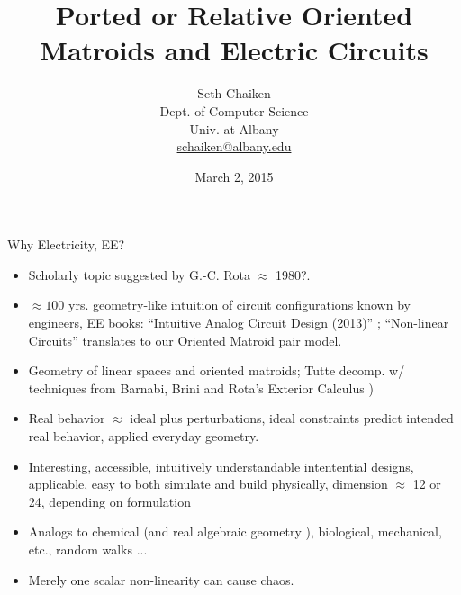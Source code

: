 \documentclass{beamer}
\title{Ported or Relative Oriented Matroids and Electric Circuits}
\author{Seth Chaiken\\
Dept. of Computer Science\\
Univ. at Albany\\
\url{schaiken@albany.edu}
}
\date{March 2, 2015}
\begin{document}
\begin{frame}
 \titlepage
\end{frame}


\begin{frame}{Why Electricity, EE?}
\begin{itemize}
\item Scholarly topic suggested by G.-C. Rota $\approx$ 1980?.
\item $\approx 100$ yrs. geometry-like intuition of
circuit configurations known by engineers, EE books:
``Intuitive Analog Circuit Design (2013)''
\cite{intuitAna}; ``Non-linear Circuits'' \cite{HaslerNeirynck}
translates to our Oriented Matroid pair model.

\item Geometry of linear spaces and oriented matroids;
Tutte decomp. w/
techniques from Barnabi, Brini and Rota's Exterior Calculus 
\cite{exteriorCalc})

\item
Real behavior $\approx$ ideal plus perturbations,
ideal constraints predict intended real behavior,
applied everyday geometry.

\item 
Interesting, accessible, intuitively understandable
intentential designs, applicable,
easy to both simulate and build physically, dimension
$\approx$
12 or 24, depending on formulation
\item
Analogs to chemical (and real algebraic geometry 
\cite{signsInChemRAG}), biological, mechanical, etc., random walks ...
\item
Merely one scalar non-linearity can cause chaos.
\end{itemize}
\end{frame}
\end{document}
